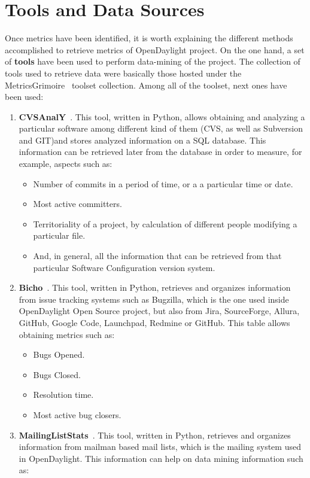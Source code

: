 \documentclass[a4paper, 12pt]{book}
\begin{document}
\section{Tools and Data Sources}
\label{sec:odl_tools_and_data_sources}
Once metrics have been identified, it is worth explaining the different methods accomplished to retrieve metrics of OpenDaylight project. On the one hand, a set of \textbf{tools} have been used to perform data-mining of the project. The collection of tools used to retrieve data were basically those hosted under the MetricsGrimoire~\cite{MetricsGrimore} toolset collection. Among all of the toolset, next ones have been used:
\begin{enumerate}\itemsep0pt
\item{\textbf{CVSAnalY}~\cite{CVSanaly}}. This tool, written in Python, allows obtaining and analyzing a particular software among different kind of them (CVS, as well as Subversion and GIT)and stores analyzed information on a SQL database. This information can be retrieved later from the database in order to measure, for example, aspects such as:
\begin{itemize}
\item{Number of commits in a period of time, or a a particular time or date}.
\item{Most active committers}.
\item{Territoriality of a project, by calculation of different people modifying a particular file}.
\item{And, in general, all the information that can be retrieved from that particular Software Configuration version system}.
\end{itemize}
\item{\textbf{Bicho}~\cite{CVSanaly}}. This tool, written in Python, retrieves and organizes information from issue tracking systems such as Bugzilla, which is the one used inside OpenDaylight Open Source project, but also from Jira, SourceForge, Allura, GitHub, Google Code, Launchpad, Redmine or GitHub. This table allows obtaining metrics such as:
\begin{itemize}\itemsep0pt
\item{Bugs Opened}.
\item{Bugs Closed}.
\item{Resolution time}.
\item{Most active bug closers}.
\end{itemize}
\item{\textbf{MailingListStats}~\cite{MailStats}}. This tool, written in Python, retrieves and organizes information from mailman based mail lists, which is the mailing system used in OpenDaylight. This information can help on data mining information such as:

\end{enumerate}
\end{document}
